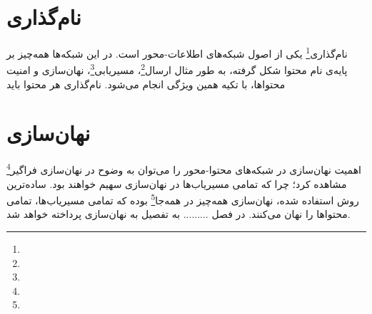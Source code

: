 \section{نام‌گذاری}
نام‌گذاری\footnote{} یکی از اصول شبکه‌های اطلاعات-محور است. در این شبکه‌ها همه‌چیز بر پایه‌ی نام محتوا شکل گرفته، به طور مثال ارسال\footnote{}، مسیریابی\footnote{}، نهان‌سازی و امنیت محتواها، با تکیه همین ویژگی انجام می‌شود. نام‌گذاری هر محتوا باید 


\section{نهان‌سازی}
اهمیت نهان‌سازی در شبکه‌های محتوا-محور را می‌توان به وضوح در نهان‌سازی فراگیر\footnote{} مشاهده کرد؛ چرا که تمامی مسیریاب‌ها در نهان‌سازی سهیم خواهند بود. ساده‌ترین روش استفاده شده، نهان‌سازی همه‌چیز در همه‌جا\footnote{} بوده که تمامی مسیریاب‌ها، تمامی محتواها را نهان می‌کنند. در فصل ......... به تفصیل به نهان‌سازی پرداخته خواهد شد.



